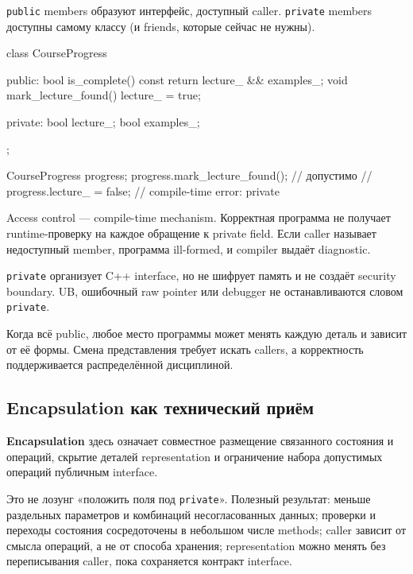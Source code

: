 \texttt{public} members образуют интерфейс, доступный caller. \texttt{private}
members доступны самому классу (и friends, которые сейчас не нужны).

\begin{cppcode}
class CourseProgress {
public:
    bool is_complete() const { return lecture_ && examples_; }
    void mark_lecture_found() { lecture_ = true; }

private:
    bool lecture_{};
    bool examples_{};
};

CourseProgress progress;
progress.mark_lecture_found(); // допустимо
// progress.lecture_ = false;  // compile-time error: private
\end{cppcode}

Access control --- compile-time mechanism. Корректная программа не получает
runtime-проверку на каждое обращение к private field. Если caller называет
недоступный member, программа ill-formed, и compiler выдаёт diagnostic.

\begin{warningbox}
\texttt{private} организует C++ interface, но не шифрует память и не создаёт
security boundary. UB, ошибочный raw pointer или debugger не останавливаются
словом \texttt{private}.
\end{warningbox}

Когда всё public, любое место программы может менять каждую деталь и зависит
от её формы. Смена представления требует искать callers, а корректность
поддерживается распределённой дисциплиной.

\subsection{Encapsulation как технический приём}

\begin{definition}
\textbf{Encapsulation} здесь означает совместное размещение связанного
состояния и операций, скрытие деталей representation и ограничение набора
допустимых операций публичным interface.
\end{definition}

Это не лозунг «положить поля под \texttt{private}». Полезный результат:
меньше раздельных параметров и комбинаций несогласованных данных; проверки и переходы состояния сосредоточены в небольшом числе methods; caller зависит от смысла операций, а не от способа хранения; representation можно менять без переписывания caller, пока сохраняется контракт interface.

